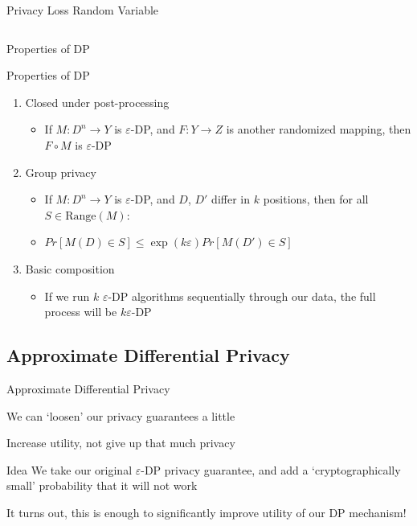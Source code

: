 \documentclass[12pt,aspectratio=169]{beamer}
\begin{document}
\begin{frame}{Privacy Loss Random Variable}
\begin{columns}[T]
\begin{column}{.5\textwidth}
\end{column}
\end{columns}

\end{frame}

\begin{frame}{Properties of DP}

\begin{block}{Properties of DP}
\begin{enumerate}
    \item Closed under post-processing
    \begin{itemize}
        \item If $M: D^n \rightarrow Y$ is $\varepsilon$-DP, and $F: Y \rightarrow Z$ is another randomized mapping, then $F \circ M$ is $\varepsilon$-DP
    \end{itemize}
    \item Group privacy
    \begin{itemize}
        \item If $M: D^n \rightarrow Y$ is $\varepsilon$-DP, and $D$, $D'$ differ in $k$ positions, then for all $S \in \text{Range}(M)$:
        \item[] $Pr[M(D) \in S] \leq \exp (k\varepsilon) Pr[M(D') \in S]$
    \end{itemize}
    \item Basic composition
    \begin{itemize}
        \item If we run $k$ $\varepsilon$-DP algorithms sequentially through our data, the full process will be $k\varepsilon$-DP
    \end{itemize}
\end{enumerate}
\end{block}


\end{frame}


\subsection{Approximate Differential Privacy}

\begin{frame}{Approximate Differential Privacy}

We can `loosen' our privacy guarantees a little

Increase utility, not give up that much privacy

\begin{block}{Idea}
We take our original $\varepsilon$-DP privacy guarantee, and add a `cryptographically small' probability that it will not work
\end{block}

It turns out, this is enough to significantly improve utility of our DP mechanism!

\end{frame}
\end{document}
